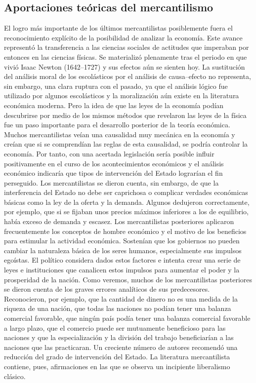 \documentclass[10pt]{book}
\begin{document}
\subsection*{Aportaciones teóricas del mercantilismo}
El logro más importante de los últimos mercantilistas posiblemente fuera el reconocimiento explícito de la posibilidad de analizar la economía. Este avance representó la transferencia a las ciencias sociales de actitudes que imperaban por entonces en las ciencias físicas. Se materializó plenamente tras el periodo en que vivió Isaac Newton (1642–1727) y sus efectos aún se sienten hoy. La sustitución del análisis moral de los escolásticos por el análisis de causa–efecto no representa, sin embargo, una clara ruptura con el pasado, ya que el análisis lógico fue utilizado por algunos escolásticos y la moralización aún existe en la literatura económica moderna. Pero la idea de que las leyes de la economía podían descubrirse por medio de los mismos métodos que revelaron las leyes de la física fue un paso importante para el desarrollo posterior de la teoría económica. Muchos mercantilistas veían una causalidad muy mecánica en la economía y creían que si se comprendían las reglas de esta causalidad, se podría controlar la economía. Por tanto, con una acertada legislación sería posible influir positivamente en el curso de los acontecimientos económicos y el análisis económico indicaría que tipos de intervención del Estado lograrían el fin perseguido. Los mercantilistas se dieron cuenta, sin embargo, de que la interferencia del Estado no debe ser caprichosa o complicar verdades económicas básicas como la ley de la oferta y la demanda. Algunos dedujeron correctamente, por ejemplo, que si se fijaban unos precios máximos inferiores a los de equilibrio, había exceso de demanda y escasez. Los mercantilistas posteriores aplicaron frecuentemente los conceptos de hombre económico y el motivo de los beneficios para estimular la actividad económica. Sostenían que los gobiernos no pueden cambiar la naturaleza básica de los seres humanos, especialmente sus impulsos egoístas. El político considera dados estos factores e intenta crear una serie de leyes e instituciones que canalicen estos impulsos para aumentar el poder y la prosperidad de la nación. Como veremos, muchos de los mercantilistas posteriores se dieron cuenta de los graves errores analíticos de sus predecesores. Reconocieron, por ejemplo, que la cantidad de dinero no es una medida de la riqueza de una nación, que todas las naciones no podían tener una balanza comercial favorable, que ningún país podía tener una balanza comercial favorable a largo plazo, que el comercio puede ser mutuamente beneficioso para las naciones y que la especialización y la división del trabajo beneficiarían a las naciones que las practicaran. Un creciente número de autores recomendó una reducción del grado de intervención del Estado. La literatura mercantilista contiene, pues, afirmaciones en las que se observa un incipiente liberalismo clásico.
\end{document}
